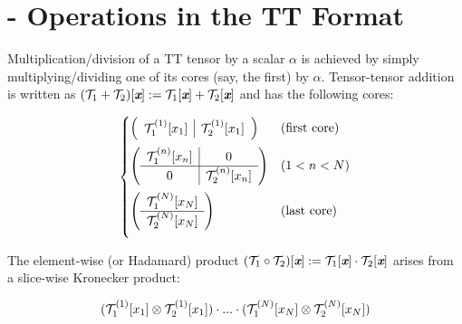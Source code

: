\documentclass[review, twocolumn]{svjour3}          %
\begin{document}
\appendix
\renewcommand{\thesection}{Appendix \Alph{section}}

\section{- Operations in the TT Format} \label{app:operations}

Multiplication/division of a TT tensor by a scalar $\alpha$ is achieved by simply multiplying/dividing one of its cores (say, the first) by $\alpha$. Tensor-tensor addition is written as $(\set{T}_1 + \set{T}_2)[\vec{x}] := \set{T}_1[\vec{x}] + \set{T}_2[\vec{x}]$ and has the following cores:

\begin{equation*}
\begin{cases}
\mleft(
\begin{array}{c|c}
  \set{T}_1^{(1)} [x_1] & \set{T}_2^{(1)} [x_1] \\
\end{array}
\mright) & \mbox{(first core)} \vspace{2mm} \\
\mleft(
\begin{array}{c|c}
  \set{T}_1^{(n)} [x_n] & 0 \\
  \hline
  0 & \set{T}_2^{(n)} [x_n]
\end{array}
\mright) & (1 < n < N) \vspace{2mm} \\
\mleft(
\begin{array}{c}
  \set{T}_1^{(N)} [x_N] \\
  \hline
  \set{T}_2^{(N)} [x_N]
\end{array}
\mright) & \mbox{(last core)} \vspace{2mm} \\
\end{cases}
\end{equation*}

The element-wise (or Hadamard) product $(\set{T}_1 \circ \set{T}_2)[\vec{x}] := \set{T}_1[\vec{x}] \cdot \set{T}_2[\vec{x}]$ arises from a slice-wise Kronecker product:

\begin{equation}
(\mathcal{T}_1^{(1)}[x_1] \otimes \mathcal{T}_2^{(1)}[x_1]) \cdot ... \cdot (\mathcal{T}_1^{(N)}[x_N] \otimes \mathcal{T}_2^{(N)}[x_N])
\end{equation}

\end{document}
